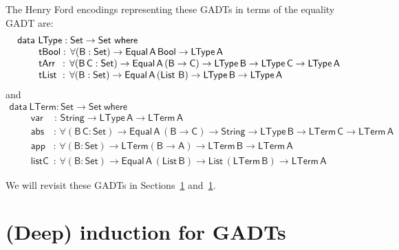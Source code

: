 \documentclass[9pt]{entcs}
\begin{document}
The Henry Ford encodings representing these GADTs in terms of the
equality GADT are:
\begin{equation}\label{eq:eq_ltype}
\begin{array}{l}
\mathsf{data\ LType : Set \to Set\ where}\\
\mathsf{\;\;\;\;\;\;\;\;tBool :\, \forall (B : Set) \to Equal\,A\,Bool
  \to LType\,A}\\ 
\mathsf{\;\;\;\;\;\;\;\;tArr\,\,\, :\, \forall (B\,C : Set) \to
  Equal\,A\,(B \to C) \to LType\,B \to LType\,C \to LType\,A}\\ 
  \mathsf{\;\;\;\;\;\;\;\;tList\,\, :\, \forall (B : Set) \to
    Equal\,A\,(\mathsf{List}\,\,B) \to LType\,B \to LType\,A} 
\end{array}
\end{equation}
and
\begin{equation}\label{eq:eq_lterm}
\begin{array}{l}
\mathsf{data\ LTerm : Set \to Set\ where}\\
\mathsf{\;\;\;\;\;\;\;\;var\,\,\,\,\,\,\,:\, String \to LType\,A \to
  LTerm\,A} \\  
\mathsf{\;\;\;\;\;\;\;\;abs\,\,\,\,\,\, :\, \forall (B\,C : Set) \to
  Equal\,A\,(B \to C) \to String \to LType\,B \to LTerm\,C \to
  LTerm\,A}\\ 
  \mathsf{\;\;\;\;\;\;\;\;app\,\,\,\,\, :\, \forall (B : Set) \to
    LTerm (B \to A) \to LTerm\,B \to LTerm\,A} \\ 
  \mathsf{\;\;\;\;\;\;\;\;listC\,\,\, :\, \forall (B : Set) \to
    Equal\,A\,(List\,B) \to List\,(LTerm\,B) \to LTerm\,A} 
\end{array}
\end{equation}

\vspace*{0.05in}

We will revisit these GADTs in {\color{red} Sections~\ref{}
  and~\ref{}}.

\vfill

\pagebreak

\section{(Deep) induction for GADTs}

\end{document}
